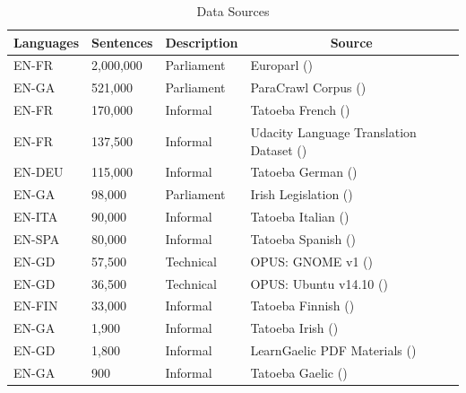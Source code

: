 \begin{table}[!ht]
\centering
\begin{tabular}{|l|l|l|l|}
\hline
\multicolumn{1}{|c|}{\textbf{Languages}} & \multicolumn{1}{c|}{\textbf{Sentences}} & \textbf{Description} & \multicolumn{1}{c|}{\textbf{Source}} \\ \hline
EN-FR   & 2,000,000     & Parliament    & Europarl (\cite{french_corpus_2005}) \\ \hline
EN-GA   & 521,000       & Parliament    & ParaCrawl Corpus (\cite{irish_paracrawl_2020}) \\ \hline
EN-FR   & 170,000       & Informal      & Tatoeba French (\cite{tatoeba_data_2020}) \\ \hline
EN-FR   & 137,500       & Informal      & Udacity Language Translation Dataset (\cite{udacity_data_2020}) \\ \hline
EN-DEU  & 115,000       & Informal      & Tatoeba German (\cite{tatoeba_data_2020}) \\ \hline
EN-GA   & 98,000        & Parliament    & Irish Legislation (\cite{irish_corpus_2017}) \\ \hline
EN-ITA  & 90,000        & Informal      & Tatoeba Italian (\cite{tatoeba_data_2020}) \\ \hline
EN-SPA  & 80,000        & Informal      & Tatoeba Spanish (\cite{tatoeba_data_2020}) \\ \hline
EN-GD   & 57,500        & Technical     & OPUS: GNOME v1 (\cite{tiedemann_opus_2012}) \\ \hline
EN-GD   & 36,500        & Technical     & OPUS: Ubuntu v14.10 (\cite{tiedemann_opus_2012}) \\ \hline
EN-FIN  & 33,000        & Informal      & Tatoeba Finnish (\cite{tatoeba_data_2020}) \\ \hline
EN-GA   & 1,900         & Informal      & Tatoeba Irish (\cite{tatoeba_data_2020}) \\ \hline
EN-GD   & 1,800         & Informal      & LearnGaelic PDF Materials (\cite{learn_gaelic_2019}) \\ \hline
EN-GA   & 900           & Informal      & Tatoeba Gaelic (\cite{tatoeba_data_2020}) \\ \hline
\end{tabular}
\captionsetup{justification=centering,font=Large}
\caption{\label{tab:available-data} Data Sources}
\end{table}

